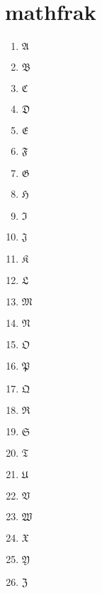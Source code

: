 \documentclass{scrartcl}
\begin{document}
\section{mathfrak}
\begin{multicols}{3}
\begin{enumerate}[label=\Alph*:]
    \item $\mathfrak{A}$
    \item $\mathfrak{B}$
    \item $\mathfrak{C}$
    \item $\mathfrak{D}$
    \item $\mathfrak{E}$
    \item $\mathfrak{F}$
    \item $\mathfrak{G}$
    \item $\mathfrak{H}$
    \item $\mathfrak{I}$
    \item $\mathfrak{J}$
    \item $\mathfrak{K}$
    \item $\mathfrak{L}$
    \item $\mathfrak{M}$
    \item $\mathfrak{N}$
    \item $\mathfrak{O}$
    \item $\mathfrak{P}$
    \item $\mathfrak{Q}$
    \item $\mathfrak{R}$
    \item $\mathfrak{S}$
    \item $\mathfrak{T}$
    \item $\mathfrak{U}$
    \item $\mathfrak{V}$
    \item $\mathfrak{W}$
    \item $\mathfrak{X}$
    \item $\mathfrak{Y}$
    \item $\mathfrak{Z}$
\end{enumerate}
\end{multicols}
\end{document}
